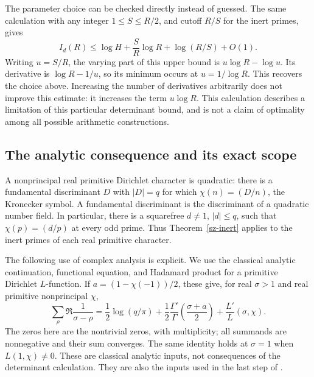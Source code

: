 The parameter choice can be checked directly instead of guessed. The same
calculation with any integer $1\le S\le R/2$, and cutoff $R/S$ for the
inert primes, gives
\[
 I_d(R)\le\log H+\frac SR\log R+\log(R/S)+O(1).
\]
Writing $u=S/R$, the varying part of this upper bound is
$u\log R-\log u$. Its derivative is $\log R-1/u$, so its minimum occurs
at $u=1/\log R$. This recovers the choice above. Increasing the number of
derivatives arbitrarily does not improve this estimate: it increases the
term $u\log R$. This calculation describes a limitation of this particular
determinant bound, and is not a claim of optimality among all possible
arithmetic constructions.

\subsection{The analytic consequence and its exact scope}

A nonprincipal real primitive Dirichlet character is quadratic:
there is a fundamental discriminant $D$ with $|D|=q$ for which
$\chi(n)=(D/n)$, the Kronecker symbol. A fundamental discriminant is
the discriminant of a quadratic number field. In particular, there is
a squarefree $d\ne1$, $|d|\le q$, such that $\chi(p)=(d/p)$ at every
odd prime. Thus Theorem~\ref{sz-inert} applies to the inert primes
of each real primitive character.

The following use of complex analysis is explicit. We use the classical
analytic continuation, functional equation, and Hadamard product for a
primitive Dirichlet $L$-function. If $a=(1-\chi(-1))/2$, these give, for
real $\sigma>1$ and real primitive nonprincipal $\chi$,
\begin{equation}\label{sz-hadamard}
 \sum_\rho\Re\frac1{\sigma-\rho}
 =\frac12\log(q/\pi)
   +\frac12\frac{\Gamma'}{\Gamma}\left(\frac{\sigma+a}{2}\right)
   +\frac{L'}{L}(\sigma,\chi).
\end{equation}
The zeros here are the nontrivial zeros, with multiplicity; all summands
are nonnegative and their sum converges. The same identity holds at
$\sigma=1$ when $L(1,\chi)\ne0$. These are classical analytic inputs,
not consequences of the determinant calculation. They are also the inputs
used in the last step of \cite{sz-openai,sz-pescador,sz-vandijk}.

